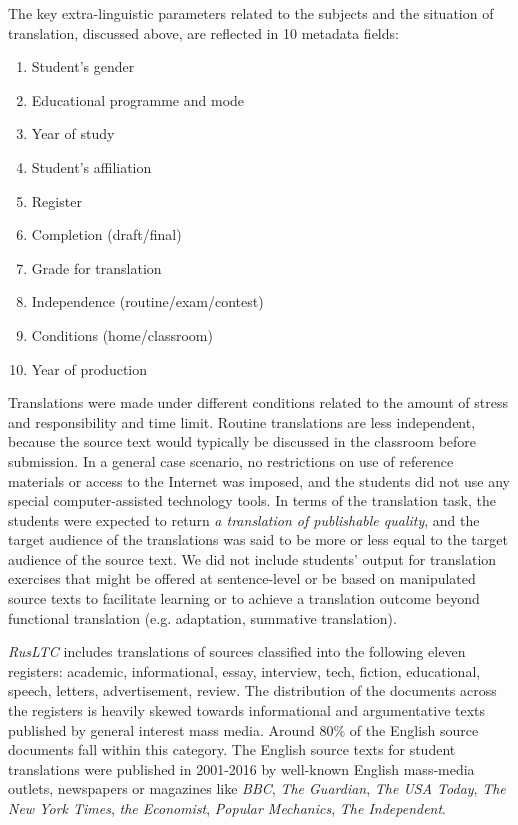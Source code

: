 The key extra-linguistic parameters related to the subjects and the situation of translation, discussed above, are reflected in 10 metadata fields:
\begin{enumerate}\compresslist{}
	\item Student's gender
	\item Educational programme and mode
	\item Year of study
	\item Student's affiliation
	\item Register
	\item Completion (draft/final)
	\item Grade for translation
	\item Independence (routine/exam/contest) 
	\item Conditions (home/classroom)
	\item Year of production
\end{enumerate}

Translations were made under different conditions related to the amount of stress and responsibility and time limit. Routine translations are less independent, because the source text would typically be discussed in the classroom before submission. In a general case scenario, no restrictions on use of reference materials or access to the Internet was imposed, and the students did not use any special computer-assisted technology tools. 
In terms of the translation task, the students were expected to return \textit{a translation of publishable quality}, and the target audience of the translations was said to be more or less equal to the target audience of the source text. We did not include students' output for translation exercises that might be offered at sentence-level or be based on manipulated source texts to facilitate learning or to achieve a translation outcome beyond functional translation (e.g. adaptation, summative translation). 

\textit{RusLTC} includes translations of sources classified into the following eleven registers: academic, informational, essay, interview, tech, fiction, educational, speech, letters, advertisement, review. The distribution of the documents across the registers is heavily skewed towards informational and argumentative texts published by general interest mass media. Around 80\% of the English source documents fall within this category.
The English source texts for student translations were published in 2001-2016 by well-known English mass-media outlets, newspapers or magazines like \textit{BBC}, \textit{The Guardian}, \textit{The USA Today}, \textit{The New York Times}, \textit{the Economist}, \textit{Popular Mechanics}, \textit{The Independent}.

